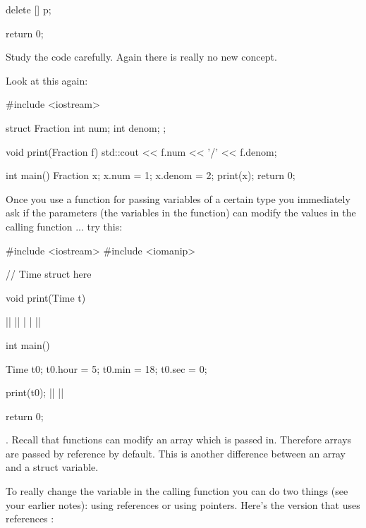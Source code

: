 \begin{center}
\begin{center}
\begin{consolethree}[escapeinside=||]
{  delete [] p;

  return 0;
}
\end{consolethree}

Study the code carefully. Again there is really no new concept.



\newpage{}

Look at this again:

\begin{consolethree}[escapeinside=||]
#include <iostream>

struct Fraction
{
    int num;
    int denom;
};

void print(Fraction f)
{
    std::cout << f.num << '/' << f.denom;
}

int main()
{
    Fraction x;
    x.num = 1;
    x.denom = 2;
    print(x);
    return 0;
}
\end{consolethree}


Once you use a function for passing variables of a certain type you
immediately ask if the parameters (the variables in the function) can
modify the values in the calling function ... try this:

\begin{consolethree}[escapeinside=||]
#include <iostream>
#include <iomanip>

// Time struct here

void print(Time t)
{
}

||
|\EMPHASIZE{\{}|
|  |
|\EMPHASIZE{\}}|

int main()
{

  Time t0;
  t0.hour = 5;
  t0.min = 18;
  t0.sec = 0;

  print(t0);
  ||
  ||

  return 0;
}
\end{consolethree}

. Recall that functions can modify an array which is
passed in. Therefore arrays are passed by reference by default. This is
another difference between an array and a struct variable.

To really change the variable in the calling function you can do two things
(see your earlier notes): using references or using pointers. Here's the
version that uses references
:


\end{center}
\end{center}
